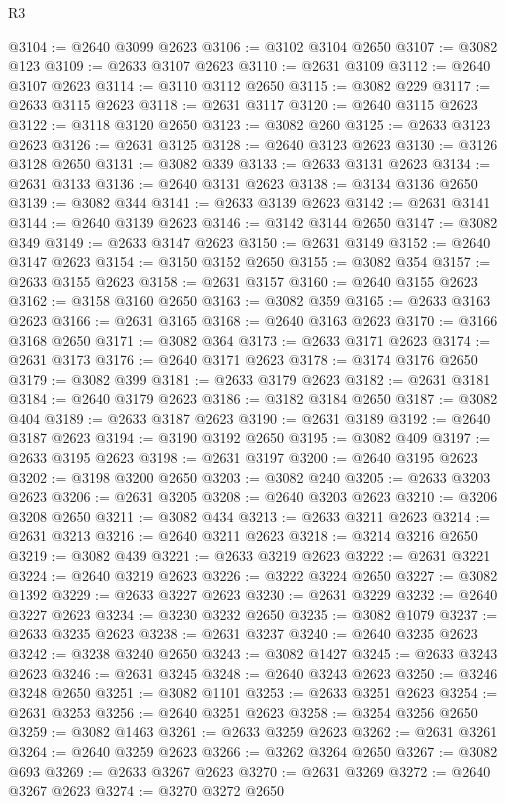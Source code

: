 \begin{lexlean}{R3}
\begin{coremodule}
@3104 := @2640 @3099 @2623
@3106 := @3102 @3104 @2650
@3107 := @3082 @123
@3109 := @2633 @3107 @2623
@3110 := @2631 @3109
@3112 := @2640 @3107 @2623
@3114 := @3110 @3112 @2650
@3115 := @3082 @229
@3117 := @2633 @3115 @2623
@3118 := @2631 @3117
@3120 := @2640 @3115 @2623
@3122 := @3118 @3120 @2650
@3123 := @3082 @260
@3125 := @2633 @3123 @2623
@3126 := @2631 @3125
@3128 := @2640 @3123 @2623
@3130 := @3126 @3128 @2650
@3131 := @3082 @339
@3133 := @2633 @3131 @2623
@3134 := @2631 @3133
@3136 := @2640 @3131 @2623
@3138 := @3134 @3136 @2650
@3139 := @3082 @344
@3141 := @2633 @3139 @2623
@3142 := @2631 @3141
@3144 := @2640 @3139 @2623
@3146 := @3142 @3144 @2650
@3147 := @3082 @349
@3149 := @2633 @3147 @2623
@3150 := @2631 @3149
@3152 := @2640 @3147 @2623
@3154 := @3150 @3152 @2650
@3155 := @3082 @354
@3157 := @2633 @3155 @2623
@3158 := @2631 @3157
@3160 := @2640 @3155 @2623
@3162 := @3158 @3160 @2650
@3163 := @3082 @359
@3165 := @2633 @3163 @2623
@3166 := @2631 @3165
@3168 := @2640 @3163 @2623
@3170 := @3166 @3168 @2650
@3171 := @3082 @364
@3173 := @2633 @3171 @2623
@3174 := @2631 @3173
@3176 := @2640 @3171 @2623
@3178 := @3174 @3176 @2650
@3179 := @3082 @399
@3181 := @2633 @3179 @2623
@3182 := @2631 @3181
@3184 := @2640 @3179 @2623
@3186 := @3182 @3184 @2650
@3187 := @3082 @404
@3189 := @2633 @3187 @2623
@3190 := @2631 @3189
@3192 := @2640 @3187 @2623
@3194 := @3190 @3192 @2650
@3195 := @3082 @409
@3197 := @2633 @3195 @2623
@3198 := @2631 @3197
@3200 := @2640 @3195 @2623
@3202 := @3198 @3200 @2650
@3203 := @3082 @240
@3205 := @2633 @3203 @2623
@3206 := @2631 @3205
@3208 := @2640 @3203 @2623
@3210 := @3206 @3208 @2650
@3211 := @3082 @434
@3213 := @2633 @3211 @2623
@3214 := @2631 @3213
@3216 := @2640 @3211 @2623
@3218 := @3214 @3216 @2650
@3219 := @3082 @439
@3221 := @2633 @3219 @2623
@3222 := @2631 @3221
@3224 := @2640 @3219 @2623
@3226 := @3222 @3224 @2650
@3227 := @3082 @1392
@3229 := @2633 @3227 @2623
@3230 := @2631 @3229
@3232 := @2640 @3227 @2623
@3234 := @3230 @3232 @2650
@3235 := @3082 @1079
@3237 := @2633 @3235 @2623
@3238 := @2631 @3237
@3240 := @2640 @3235 @2623
@3242 := @3238 @3240 @2650
@3243 := @3082 @1427
@3245 := @2633 @3243 @2623
@3246 := @2631 @3245
@3248 := @2640 @3243 @2623
@3250 := @3246 @3248 @2650
@3251 := @3082 @1101
@3253 := @2633 @3251 @2623
@3254 := @2631 @3253
@3256 := @2640 @3251 @2623
@3258 := @3254 @3256 @2650
@3259 := @3082 @1463
@3261 := @2633 @3259 @2623
@3262 := @2631 @3261
@3264 := @2640 @3259 @2623
@3266 := @3262 @3264 @2650
@3267 := @3082 @693
@3269 := @2633 @3267 @2623
@3270 := @2631 @3269
@3272 := @2640 @3267 @2623
@3274 := @3270 @3272 @2650

\end{coremodule}
\end{lexlean}

